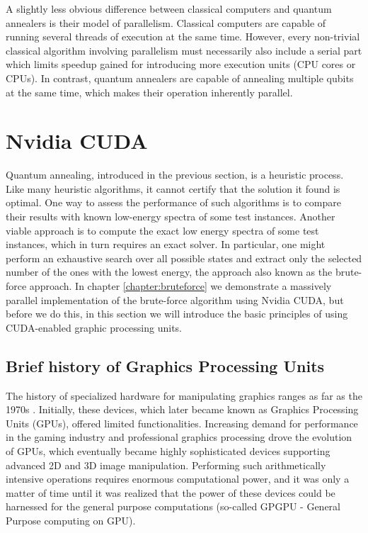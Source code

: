 A slightly less obvious difference between classical computers and quantum
annealers is their model of parallelism. Classical computers are capable of
running several threads of execution at the same time. However, every
non-trivial classical algorithm involving parallelism must necessarily also
include a serial part which limits speedup gained for introducing more
execution units (CPU cores or CPUs). In contrast, quantum annealers are capable
of annealing multiple qubits at the same time, which makes their operation
inherently parallel.

\section{Nvidia CUDA}

Quantum annealing, introduced in the previous section, is a heuristic process.
Like many heuristic algorithms, it cannot certify that the solution it found is
optimal. One way to assess the performance of such algorithms is to compare
their results with known low-energy spectra of some test instances. Another
viable approach is to compute the exact low energy spectra of some test
instances, which in turn requires an exact solver. In particular, one might
perform an exhaustive search over all possible states and extract only the
selected number of the ones with the lowest energy, the approach also known as
the brute-force approach. In chapter \ref{chapter:bruteforce} we demonstrate a
massively parallel implementation of the brute-force algorithm using Nvidia
CUDA, but before we do this, in this section we will introduce the basic
principles of using CUDA-enabled graphic processing units.

\subsection{Brief history of Graphics Processing Units}
The history of specialized hardware for manipulating graphics ranges as far as
the 1970s \cite{framebuffer}. Initially, these devices, which later became
known as Graphics Processing Units (GPUs), offered limited functionalities.
Increasing demand for performance in the gaming industry and professional
graphics processing drove the evolution of GPUs, which eventually became highly
sophisticated devices supporting advanced 2D and 3D image manipulation.
Performing such arithmetically intensive operations requires enormous
computational power, and it was only a matter of time until it was realized
that the power of these devices could be harnessed for the general purpose
computations (so-called GPGPU - General Purpose computing on GPU).

